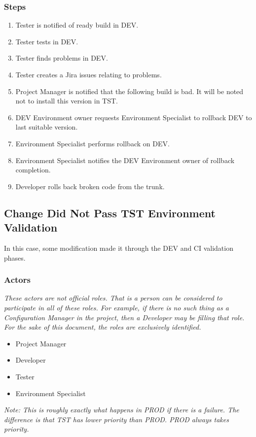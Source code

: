 \documentclass[12pt,notitlepage]{article}
\begin{document}
\subsubsection{Steps}
\begin{enumerate}
  \item Tester is notified of ready build in DEV.
  \item Tester tests in DEV.
  \item Tester finds problems in DEV.
  \item Tester creates a Jira issues relating to problems.
  \item Project Manager is notified that the following build is bad. It will be noted not
    to install this version in TST.
  \item DEV Environment owner requests Environment Specialist to rollback DEV
    to last suitable version.
  \item Environment Specialist performs rollback on DEV.
  \item Environment Specialist notifies the DEV Environment owner of rollback completion.
  \item Developer rolls back broken code from the trunk.
\end{enumerate}

\subsection{Change Did Not Pass TST Environment Validation}
In this case, some modification made it through the DEV and CI validation phases.

\subsubsection{Actors}
\emph{These actors are not official roles. That is a person can be considered to
participate in all of these roles. For example, if there is no such thing as a Configuration
Manager in the project, then a Developer may be filling that role. For the sake of
this document, the roles are exclusively identified.}
\begin{itemize}
  \item Project Manager
  \item Developer
  \item Tester
  \item Environment Specialist
\end{itemize}

\emph{Note: This is roughly exactly what happens in PROD if there is a failure. The 
difference is that TST has lower priority than PROD. PROD always takes priority.}
\end{document}
